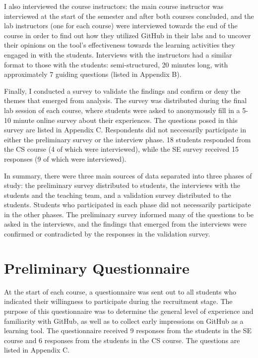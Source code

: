 I also interviewed the course instructors: the main course instructor was interviewed at the start of the semester and after both courses concluded, and the lab instructors (one for each course) were interviewed towards the end of the course in order to find out how they utilized GitHub in their labs and to uncover their opinions on the tool's effectiveness towards the learning activities they engaged in with the students. Interviews with the instructors had a similar format to those with the students: semi-structured, 20 minutes long, with approximately 7 guiding questions (listed in Appendix B).

Finally, I conducted a survey to validate the findings and confirm or deny the themes that emerged from analysis. The survey was distributed during the final lab session of each course, where students were asked to anonymously fill in a 5-10 minute online survey about their experiences. The questions posed in this survey are listed in Appendix C. Respondents did not neccesarily participate in either the preliminary survey or the interview phase. 18 students responded from the CS course (4 of which were interviewed), while the SE survey received 15 responses (9 of which were interviewed).

In summary, there were three main sources of data separated into three phases of study: the preliminary survey distributed to students, the interviews with the students and the teaching team, and a validation survey distributed to the students. Students who participated in each phase did not necessarily participate in the other phases. The preliminary survey informed many of the questions to be asked in the interviews, and the findings that emerged from the interviews were confirmed or contradicted by the responses in the validation survey.

\section{Preliminary Questionnaire}
At the start of each course, a questionnaire was sent out to all students who indicated their willingness to participate during the recruitment stage. The purpose of this questionnaire was to determine the general level of experience and familiarity with GitHub, as well as to collect early impressions on GitHub as a learning tool. The questionnaire received 9 responses from the students in the SE course and 6 responses from the students in the CS course. The questions are listed in Appendix C.

